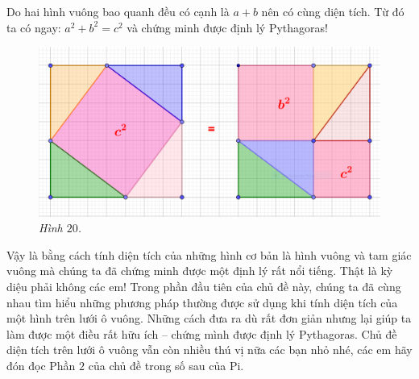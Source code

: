 \begin{multicols}{2}
\begin{figure}[H]
		\vspace*{-10pt}
	\end{figure}
	Do hai hình vuông bao quanh đều có cạnh là $a+b$ nên có cùng diện tích. Từ đó ta có ngay: $a^2+b^2=c^2$ và chứng minh được định lý Pythagoras!
	\begin{figure}[H]
		\centering
		\vspace*{-5pt}
		\captionsetup{labelformat= empty, justification=centering}
		\includegraphics[width=1\linewidth]{20}
		\caption{\small\textit{\color{toancuabi}Hình $20$.}}
		\vspace*{-10pt}
	\end{figure}
	Vậy là bằng cách tính diện tích của những hình cơ bản là hình vuông và tam giác vuông mà chúng ta đã chứng minh được một định lý rất nổi tiếng. Thật là kỳ diệu phải không các em!
	\vskip 0.1cm
	Trong phần đầu tiên của chủ đề này, chúng ta đã cùng nhau tìm hiểu những phương pháp thường được sử dụng khi tính diện tích của một hình trên lưới ô vuông. Những cách đưa ra dù rất đơn giản nhưng lại giúp ta làm được một điều rất hữu ích -- chứng mình được định lý Pythagoras. Chủ đề diện tích trên lưới ô vuông vẫn còn nhiều thú vị nữa các bạn nhỏ nhé, các em hãy đón đọc Phần $2$ của chủ đề trong số sau của Pi.	
\end{multicols}
\newpage
\begingroup

